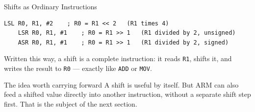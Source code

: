 \documentclass[9pt,aspectratio=169,xcolor=table]{beamer}
\begin{document}
\begin{frame}[fragile]{Shifts as Ordinary Instructions}
    \leavevmode
    \begin{lstlisting}[style=armasm, language=ARM]
	LSL R0, R1, #2    ; R0 = R1 << 2   (R1 times 4)
	LSR R0, R1, #1    ; R0 = R1 >> 1   (R1 divided by 2, unsigned)
	ASR R0, R1, #1    ; R0 = R1 >> 1   (R1 divided by 2, signed)
    \end{lstlisting}

    \vspace{3mm}
    {\small Written this way, a shift is a complete instruction: it
    reads \texttt{R1}, shifts it, and writes the result to \texttt{R0}
    --- exactly like \texttt{ADD} or \texttt{MOV}.}

    \vspace{3mm}
    \begin{block}{The idea worth carrying forward}
        A shift is useful by itself. But ARM can also feed a shifted
        value \alert{directly into another instruction}, without a
        separate shift step first. That is the subject of the next
        section.
    \end{block}
\end{frame}

\end{document}

